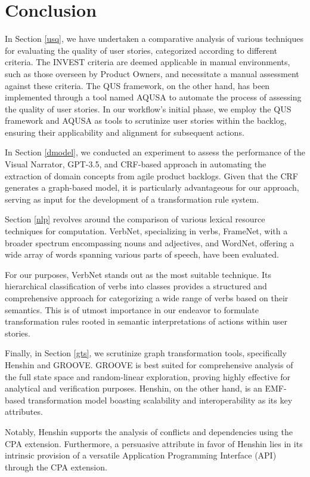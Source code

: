 \section{Conclusion}\label{conclusion}
In Section \ref{usq}, we have undertaken a comparative analysis of various techniques for evaluating the quality of user stories, categorized according to different criteria. The INVEST criteria are deemed applicable in manual environments, such as those overseen by Product Owners, and necessitate a manual assessment against these criteria. The QUS framework, on the other hand, has been implemented through a tool named AQUSA to automate the process of assessing the quality of user stories. In our workflow's initial phase, we employ the QUS framework and AQUSA as tools to scrutinize user stories within the backlog, ensuring their applicability and alignment for subsequent actions.

In Section \ref{dmodel}, we conducted an experiment to assess the performance of the Visual Narrator, GPT-3.5, and CRF-based approach in automating the extraction of domain concepts from agile product backlogs. Given that the CRF generates a graph-based model, it is particularly advantageous for our approach, serving as input for the development of a transformation rule system.

Section \ref{nlp} revolves around the comparison of various lexical resource techniques for computation. VerbNet, specializing in verbs, FrameNet, with a broader spectrum encompassing nouns and adjectives, and WordNet, offering a wide array of words spanning various parts of speech, have been evaluated. 

For our purposes, VerbNet stands out as the most suitable technique. Its hierarchical classification of verbs into classes provides a structured and comprehensive approach for categorizing a wide range of verbs based on their semantics. This is of utmost importance in our endeavor to formulate transformation rules rooted in semantic interpretations of actions within user stories.

Finally, in Section \ref{gts}, we scrutinize graph transformation tools, specifically Henshin and GROOVE. GROOVE is best suited for comprehensive analysis of the full state space and random-linear exploration, proving highly effective for analytical and verification purposes. Henshin, on the other hand, is an EMF-based transformation model boasting scalability and interoperability as its key attributes. 

Notably, Henshin supports the analysis of conflicts and dependencies using the CPA extension. Furthermore, a persuasive attribute in favor of Henshin lies in its intrinsic provision of a versatile Application Programming Interface (API) through the CPA extension.

